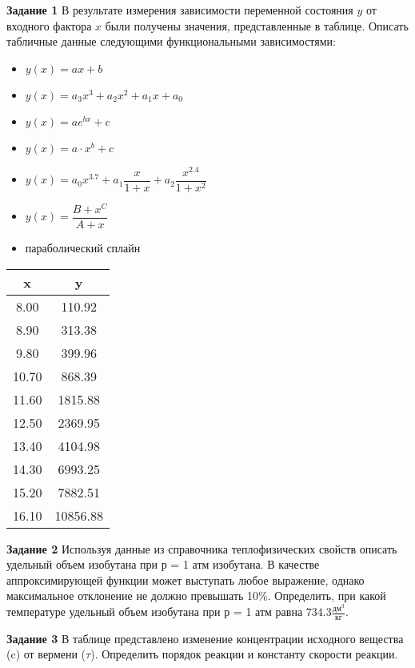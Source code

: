 \textbf{Задание 1} В результате измерения зависимости переменной состояния $y$ от входного фактора $x$ были получены значения, представленные в таблице. Описать табличные данные следующими функциональными зависимостями:
 \begin{itemize} 
\item $y(x)=a x+b$
\item $y(x)=a_3 x^3 +a_2 x^2 + a_1 x +a_0$
\item $y(x)=a e^{b x}+c  $
\item $y(x)=a \cdot x^b+c$
\item $y(x)=a_0 x^{3.7}               +a_1 \dfrac{x}{1+x}         +a_2 \dfrac{x^{2.4}}{1+x^2}$
\item $y(x)=\dfrac{B+x^C}{A+x}                 $
\item параболический сплайн
\end{itemize}
\begin{table}[h]
\begin{tabular}{|c|c|}
\hline
x & y \\ \hline
 8.00 &     110.92 \\ \hline 
 8.90 &     313.38 \\ \hline 
 9.80 &     399.96 \\ \hline 
10.70 &     868.39 \\ \hline 
11.60 &    1815.88 \\ \hline 
12.50 &    2369.95 \\ \hline 
13.40 &    4104.98 \\ \hline 
14.30 &    6993.25 \\ \hline 
15.20 &    7882.51 \\ \hline 
16.10 &   10856.88 \\ \hline 
\end{tabular}
\end{table}

\textbf{Задание 2}  Используя данные из справочника теплофизических свойств описать удельный объем изобутана при р = 1 атм изобутана. В качестве аппроксимирующей функции может выступать любое выражение, однако максимальное отклонение не должно превышать 10\%. Определить, при какой температуре удельный объем изобутана при р = 1 атм равна $   734.3 \frac {\text{дм}^3}{\text{кг}}$.

\textbf{Задание 3} В таблице представлено изменение концентрации исходного вещества (c) от вермени ($\tau$). Определить порядок реакции и константу скорости реакции.

